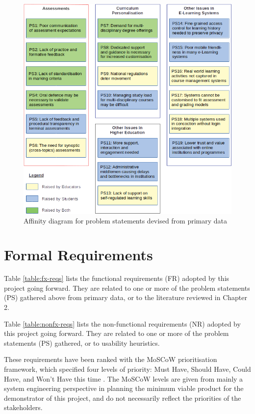 \clearpage
\begin{figure}[!ht]
	\centering
	\includegraphics[width=1.0\textwidth]{ps-affinity}
	\caption[Affinity diagram for primary data]
	{Affinity diagram for problem statements devised from primary data}
	\label{fig:ps-affinity}
\end{figure}

\section{Formal Requirements}

Table \ref{table:fx-reqs} lists the functional requirements (FR) adopted by this
project going forward. They are related to one or more of the problem statements (PS) gathered
above from primary data, or to the literature reviewed in Chapter 2.

Table \ref{table:nonfx-reqs} lists the non-functional requirements (NR) adopted by this
project going forward. They are related to one or more of the problem statements (PS) gathered,
or to usability heuristics.

These requirements have been ranked with the MoSCoW prioritisation
framework, which specified four levels of priority: Must Have, Should Have, Could Have, and Won’t Have
this time \citep{agile2018moscow}. The MoSCoW levels are given from mainly a system engineering perspective
in planning the minimum viable product for the demonstrator of this project,
and do not necessarily reflect the priorities of the stakeholders.

